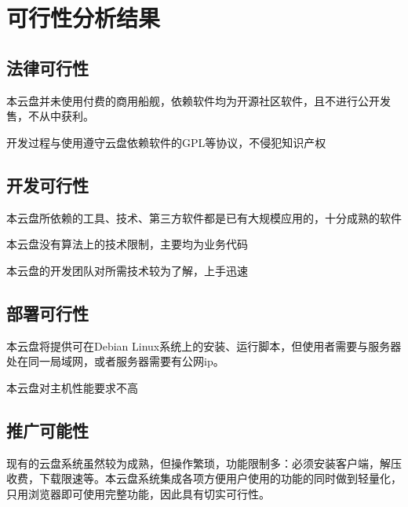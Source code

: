 \chapter{可行性分析结果}

\section{法律可行性}

本云盘并未使用付费的商用船舰，依赖软件均为开源社区软件，且不进行公开发售，不从中获利。

开发过程与使用遵守云盘依赖软件的GPL等协议，不侵犯知识产权

\section{开发可行性}

本云盘所依赖的工具、技术、第三方软件都是已有大规模应用的，十分成熟的软件

本云盘没有算法上的技术限制，主要均为业务代码

本云盘的开发团队对所需技术较为了解，上手迅速

\section{部署可行性}

本云盘将提供可在Debian Linux系统上的安装、运行脚本，但使用者需要与服务器处在同一局域网，或者服务器需要有公网ip。

本云盘对主机性能要求不高

\section{推广可能性}

现有的云盘系统虽然较为成熟，但操作繁琐，功能限制多：必须安装客户端，解压收费，下载限速等。本云盘系统集成各项方便用户使用的功能的同时做到轻量化，只用浏览器即可使用完整功能，因此具有切实可行性。
